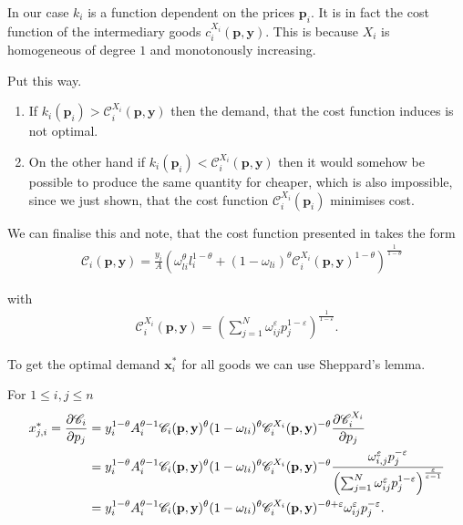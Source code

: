 \documentclass{article}
\newcommand{\costf}[1]{\mathscr{C}_#1}
\newcommand{\cfx}[1]{\mathscr{C}_#1^{X_#1}}
\begin{document}
In our case $k_i$ is a function dependent on the prices $\mathbf p_{i}$. It is in fact the cost function of the intermediary goods $c_i^{X_i}(\mathbf p,\mathbf y)$.
This is because $X_i$ is homogeneous of degree $1$ and monotonously increasing.

Put this way. 
\begin{enumerate}
  \item If $k_i(\mathbf p_i) > \mathscr{C}_i^{X_i}(\mathbf p,\mathbf y)$ then the demand, that the cost function induces is not optimal.
  \item On the other hand if $k_i(\mathbf p_i) < \mathscr{C}_i^{X_i}(\mathbf p,\mathbf y)$ then it would somehow be possible to produce the same quantity for cheaper, which is also impossible,
    since we just shown, that the cost function $\mathscr{C}_i^{X_i}(\mathbf p_i)$ minimises cost.
\end{enumerate}

We can finalise this and note, that the cost function presented in \parencite{BF2019} takes the form
\begin{align*}
  &\costf{i} (\mathbf p, \mathbf y) = \frac {y_i}{A} \left(\omega_{li}^\theta l_i^{1-\theta} + (1 - \omega_{li})^\theta \mathscr{C}_i^{X_i}(\mathbf p,\mathbf y) ^{1-\theta} \right)^{\frac{1}{1- \theta}}
\end{align*}

with 
\begin{align*}
  \cfx{i}(\mathbf p, \mathbf y) = \left( \sum_{j=1}^N \omega_{ij}^{ \varepsilon} p_{j}^{1 - \varepsilon} \right)^{\frac{1}{1 - \varepsilon}}. 
\end{align*}

To get the optimal demand $\mathbf x_{i}^*$ for all goods we can use Sheppard's lemma.

For $1 \leq i,j \leq n$
\begin{align}
  \label{eq:optprod}
  x_{j,i}^* = \frac{\partial \costf{i}}{\partial p_j} &=  y_i^{1 - \theta} A_i^{\theta - 1} \costf{i}(\mathbf p,\mathbf y)^{\theta} (1-\omega_{li})^\theta \cfx{i}(\mathbf p,\mathbf y)^{-\theta} \frac{\partial \cfx{i}}{\partial p_j} \\
                                                   & =  y_i^{1 - \theta} A_i^{\theta - 1} \costf{i}(\mathbf p,\mathbf y)^\theta(1-\omega_{li})^\theta \cfx{i}(\mathbf p,\mathbf y)^{-\theta}  \frac{\omega_{i,j}^{ \varepsilon} p_{j}^{- \varepsilon}}{\left( \sum_{j=1}^N \omega_{ij}^{\varepsilon} p_{j}^{1 - \varepsilon} \right)^{\frac {\varepsilon}{\varepsilon - 1}}} \notag \\ 
  & =  y_i^{1 - \theta} A_i^{\theta - 1} \costf{i}(\mathbf p,\mathbf y)^ \theta (1-\omega_{li})^\theta \cfx{i}(\mathbf p,\mathbf y)^{-\theta + \varepsilon}  \omega_{ij}^{ \varepsilon} p_{j}^{- \varepsilon}. \notag
\end{align}
\end{document}
